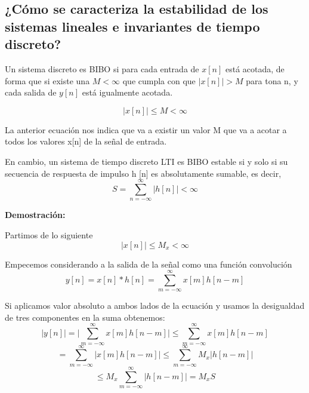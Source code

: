 \subsection{¿Cómo se caracteriza la estabilidad de los sistemas lineales e invariantes de tiempo discreto?}

	
	Un sistema discreto es BIBO si para cada entrada de $x[n]$ está acotada, de forma que si existe una $M<\infty$ que cumpla con que $|x[n]|>M$ para tona n, y cada salida de $y[n]$ está igualmente acotada.
	
	\begin{equation}
	|x[n]| \leq M < \infty
	\end{equation}
	
	La anterior ecuación nos indica que va a existir un valor M que va a acotar a todos los valores x[n] de la señal de entrada.
	
	En cambio, un sistema de tiempo discreto LTI es BIBO estable si y solo si su secuencia de respuesta de impulso {h [n]} es absolutamente sumable, es decir,
	\begin{equation}
		S=\sum_{n=-\infty}^{\infty}|h[n]|<\infty
	\end{equation}
	
	\noindent\textbf{Demostración:}

	Partimos de lo siguiente
	\begin{equation}
		|x[n]| \leq M_x < \infty
	\end{equation}		
	
	Empecemos considerando a la salida de la señal como una función convolución
	\begin{equation}
		y[n]=x[n]*h[n]=\sum_{m=-\infty}^{\infty}x[m]h[n-m]
	\end{equation}
	
	Si aplicamos valor absoluto a ambos lados de la ecuación y usamos la desigualdad de tres componentes en la suma obtenemos: 
	\begin{equation}
		\lvert y[n]\rvert = \lvert \sum_{m=-\infty}^{\infty}x[m]h[n-m] \rvert \leq \sum_{m=-\infty}^{\infty}x[m]h[n-m]
	\end{equation}		
	\begin{equation}
		=\sum_{m=-\infty}^{\infty}\lvert x[m]h[n-m] \rvert \leq \sum_{m=-\infty}^{\infty}M_x \lvert h[n-m] \rvert
	\end{equation}
	\begin{equation}
		\leq M_x \sum_{m=-\infty}^{\infty} \lvert h[n-m] \rvert = M_xS
	\end{equation}

